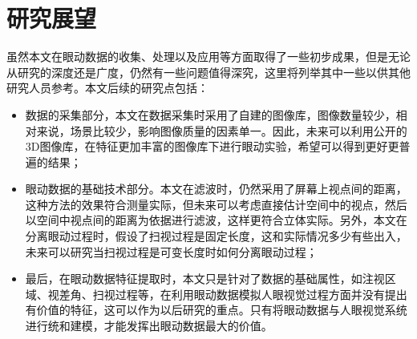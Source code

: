 \section{研究展望}
虽然本文在眼动数据的收集、处理以及应用等方面取得了一些初步成果，但是无论从研究的深度还是广度，仍然有一些问题值得深究，这里将列举其中一些以供其他研究人员参考。本文后续的研究点包括：
\begin{itemize}[noitemsep,topsep=0pt,parsep=0pt,partopsep=0pt]
\item 数据的采集部分，本文在数据采集时采用了自建的图像库，图像数量较少，相对来说，场景比较少，影响图像质量的因素单一。因此，未来可以利用公开的3D图像库，在特征更加丰富的图像库下进行眼动实验，希望可以得到更好更普遍的结果；
\item 眼动数据的基础技术部分。本文在滤波时，仍然采用了屏幕上视点间的距离，这种方法的效果符合测量实际，但未来可以考虑直接估计空间中的视点，然后以空间中视点间的距离为依据进行滤波，这样更符合立体实际。另外，本文在分离眼动过程时，假设了扫视过程是固定长度，这和实际情况多少有些出入，未来可以研究当扫视过程是可变长度时如何分离眼动过程；
\item 最后，在眼动数据特征提取时，本文只是针对了数据的基础属性，如注视区域、视差角、扫视过程等，在利用眼动数据模拟人眼视觉过程方面并没有提出有价值的特征，这可以作为以后研究的重点。只有将眼动数据与人眼视觉系统进行统和建模，才能发挥出眼动数据最大的价值。
\end{itemize}
